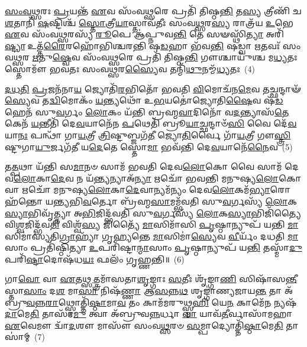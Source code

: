 {%
\-\ul{𑌸𑌂}\-\-\ul{𑌵}\-\-\ul{𑌥𑍍𑌸}\-𑌰𑌃 \ul{𑌪𑍍𑌰}\-𑌯𑌨𑍍𑌤᳴ \ul{𑌏}\-𑌵 𑌸𑌂᳴𑌵\-\ul{𑌥𑍍𑌸}\-𑌰𑍇 𑌪𑍍𑌰𑌤𑌿᳴ 𑌤𑌿𑌷𑍍𑌠\-\ul{𑌨𑍍𑌤𑌿} 𑌤\-\ul{𑌸𑍍𑌯} 𑌤𑍍𑌰𑍀𑌣𑌿᳴ 𑌚 \ul{𑌶}\-𑌤𑌾𑌨𑌿᳴ \ul{𑌷}\-𑌷𑍍𑌟𑌿𑌶𑍍𑌚᳴ \ul{𑌸𑍍𑌤𑍋}\-𑌤𑍍𑌰𑍀\-\ul{𑌯𑌾}\-𑌸𑍍𑌤𑌾𑌵᳴𑌤𑍀𑌃 𑌸𑌂𑌵\-\ul{𑌥𑍍𑌸}\-𑌰\-\ul{𑌸𑍍𑌯} 𑌰𑌾𑌤𑍍𑌰᳴𑌯 \ul{𑌉}\-𑌭𑍇 \ul{𑌏}\-𑌵 𑌸𑌂᳴𑌵\-\ul{𑌥𑍍𑌸}\-𑌰𑌸𑍍𑌯᳴ \ul{𑌰𑍂}\-𑌪𑍇 𑌆॑𑌪𑍍𑌨𑍁𑌵\-\ul{𑌨𑍍𑌤𑌿} 𑌤𑍇 𑌸𑍟𑌸𑍍𑌥𑌿᳴\-\ul{𑌤𑍍𑌯𑌾} 𑌅𑌰𑌿᳴\-\ul{𑌷𑍍𑌟𑍍𑌯𑌾} 𑌉𑌤𑍍𑌤᳴\-\ul{𑌰𑍈}\-𑌰𑌹𑍋᳴𑌭𑌿𑌶𑍍𑌚𑌰𑌨𑍍𑌤𑌿 𑌷\-\ul{𑌡}\-𑌹𑌾 𑌭᳴𑌵\-\ul{𑌨𑍍𑌤𑌿} 𑌷𑌡𑍍𑌵𑌾 \ul{𑌋}\-𑌤𑌵𑌃᳴ 𑌸𑌂𑌵\-\ul{𑌥𑍍𑌸}\-𑌰 \ul{𑌋}\-𑌤𑍁\-\ul{𑌷𑍍𑌵𑍇}\-𑌵 𑌸𑌂᳴𑌵\-\ul{𑌥𑍍𑌸}\-𑌰𑍇 𑌪𑍍𑌰𑌤𑌿᳴ 𑌤𑌿𑌷𑍍𑌠\-\ul{𑌨𑍍𑌤𑌿} 𑌗𑍗𑌶𑍍𑌚𑌾𑌯𑍁᳴𑌶𑍍𑌚 𑌮\-\ul{𑌧𑍍𑌯}\-𑌤𑌃 𑌸𑍍𑌤𑍋𑌮𑍗᳴ 𑌭𑌵𑌤𑌃 𑌸𑌂𑌵\-\ul{𑌥𑍍𑌸}\-𑌰\-\ul{𑌸𑍍𑌯𑍈}\-𑌵 𑌤𑌨𑍍𑌮𑌿᳴\-\ul{𑌥𑍁}\-𑌨𑌮𑍍𑌮᳴\-\ul{𑌧𑍍𑌯}\-𑌤𑌃~(4)

\-\ul{𑌦}\-\-\ul{𑌧}\-\-\ul{𑌤𑌿} \ul{𑌪𑍍𑌰}\-𑌜𑌨᳴𑌨𑌾\-\ul{𑌯} 𑌜𑍍𑌯𑍋𑌤𑌿᳴\-\ul{𑌰}\-𑌭𑌿𑌤𑍋᳴ 𑌭𑌵𑌤𑌿 \ul{𑌵𑌿}\-𑌮𑍋𑌚᳴𑌨\-\ul{𑌮𑍇}\-𑌵 𑌤𑌚𑍍𑌛𑌨𑍍𑌦𑌾𑍟᳴\-\ul{𑌸𑍍𑌯𑍇}\-𑌵 𑌤\-\ul{𑌦𑍍𑌵𑌿}\-𑌮𑍋𑌕𑌂᳴ \ul{𑌯}\-𑌨𑍍𑌤𑍍𑌯𑌥𑍋᳴ 𑌉\-\ul{𑌭}\-𑌯𑌤𑍋॑𑌜𑍍𑌯𑍋𑌤𑌿\-\ul{𑌷𑍈}\-𑌵 𑌷᳴\-\ul{𑌡}\-𑌹𑍇𑌨᳴ 𑌸𑍁\-\ul{𑌵}\-𑌰𑍍𑌗𑌂 \ul{𑌲𑍋}\-𑌕𑌂 𑌯᳴𑌨𑍍𑌤𑌿 𑌬𑍍𑌰𑌹𑍍𑌮\-\ul{𑌵𑌾}\-𑌦𑌿𑌨𑍋᳴ 𑌵\-\ul{𑌦}\-𑌨𑍍𑌤𑍍𑌯𑌾𑌸᳴\-\ul{𑌤𑍇} 𑌕𑍇𑌨᳴ \ul{𑌯}\-𑌨𑍍𑌤𑍀𑌤𑌿᳴ 𑌦𑍇\-\ul{𑌵}\-𑌯𑌾𑌨𑍇᳴𑌨 \ul{𑌪}\-𑌥𑍇𑌤𑌿᳴ 𑌬𑍍𑌰𑍂\-\ul{𑌯𑌾}\-𑌚𑍍𑌛𑌨𑍍𑌦𑌾𑍞᳴\-\ul{𑌸𑌿} 𑌵𑍈 𑌦𑍇᳴\-\ul{𑌵}\-𑌯𑌾\-\ul{𑌨𑌃} 𑌪𑌨𑍍𑌥𑌾᳴ 𑌗𑌾\-\ul{𑌯}\-𑌤𑍍𑌰𑍀 \ul{𑌤𑍍𑌰𑌿}\-𑌷𑍍𑌟𑍁𑌬𑍍𑌜𑌗᳴\-\ul{𑌤𑍀} 𑌜𑍍𑌯𑍋\-\ul{𑌤𑌿}\-𑌰𑍍𑌵𑍈 𑌗𑌾᳴\-\ul{𑌯}\-𑌤𑍍𑌰𑍀 𑌗𑍗\-\ul{𑌸𑍍𑌤𑍍𑌰𑌿}\-𑌷𑍍𑌟𑍁𑌗𑌾\-\ul{𑌯𑍁}\-𑌰𑍍𑌜𑌗᳴𑌤𑍀 𑌯\-\ul{𑌦𑍇}\-𑌤𑍇 𑌸𑍍𑌤𑍋\-\ul{𑌮𑌾} 𑌭𑌵᳴𑌨𑍍𑌤𑌿 𑌦𑍇\-\ul{𑌵}\-𑌯𑌾𑌨𑍇᳴\-\ul{𑌨𑍈}\-𑌵~(5)

𑌤\-\ul{𑌤𑍍𑌪}\-𑌥𑌾 𑌯᳴𑌨𑍍𑌤𑌿 𑌸\-\ul{𑌮𑌾}\-𑌨𑍞 𑌸𑌾𑌮᳴ 𑌭𑌵𑌤𑌿 𑌦𑍇𑌵\-\ul{𑌲𑍋}\-𑌕𑍋 𑌵𑍈 𑌸𑌾𑌮᳴ 𑌦𑍇𑌵\-\ul{𑌲𑍋}\-𑌕𑌾\-\ul{𑌦𑍇}\-𑌵 𑌨 𑌯᳴\-\ul{𑌨𑍍𑌤𑍍𑌯}\-𑌨𑍍𑌯𑌾𑌅᳴\-\ul{𑌨𑍍𑌯𑌾} 𑌋𑌚𑍋᳴ 𑌭𑌵𑌨𑍍𑌤𑌿 𑌮𑌨𑍁𑌷𑍍𑌯\-\ul{𑌲𑍋}\-𑌕𑍋 𑌵𑌾 𑌋𑌚𑍋᳴ 𑌮𑌨𑍁𑌷𑍍𑌯\-\ul{𑌲𑍋}\-𑌕𑌾\-\ul{𑌦𑍇}\-𑌵𑌾𑌨𑍍𑌯𑌮᳴𑌨𑍍𑌯𑌂 𑌦𑍇𑌵\-\ul{𑌲𑍋}\-𑌕𑌮᳴\-\ul{𑌭𑍍𑌯𑌾}\-𑌰𑍋𑌹᳴𑌨𑍍𑌤𑍋 𑌯𑌨𑍍𑌤𑍍𑌯𑌭𑌿\-\ul{𑌵}\-𑌰𑍍𑌤𑍋 𑌬𑍍𑌰᳴𑌹𑍍𑌮\-\ul{𑌸𑌾}\-𑌮𑌮𑍍𑌭᳴𑌵𑌤𑌿 𑌸𑍁\-\ul{𑌵}\-𑌰𑍍𑌗𑌸𑍍𑌯᳴ \ul{𑌲𑍋}\-𑌕\-\ul{𑌸𑍍𑌯𑌾}\-𑌭𑌿𑌵𑍃᳴𑌤𑍍𑌤𑍍𑌯𑌾 𑌅\-\ul{𑌭𑌿}\-𑌜𑌿𑌦𑍍𑌭᳴𑌵𑌤𑌿 𑌸𑍁\-\ul{𑌵}\-𑌰𑍍𑌗𑌸𑍍𑌯᳴ \ul{𑌲𑍋}\-𑌕\-\ul{𑌸𑍍𑌯𑌾}\-𑌭𑌿𑌜𑌿᳴𑌤𑍍𑌯𑍈 𑌵𑌿\-\ul{𑌶𑍍𑌵}\-𑌜𑌿𑌦𑍍𑌭᳴𑌵\-\ul{𑌤𑌿} 𑌵𑌿𑌶𑍍𑌵᳴\-\ul{𑌸𑍍𑌯} 𑌜𑌿𑌤𑍍𑌯𑍈᳴ \ul{𑌮𑌾}\-𑌸𑌿𑌮𑌾᳴𑌸𑌿 \ul{𑌪𑍃}\-𑌷𑍍𑌠𑌾𑌨𑍍𑌯𑍁𑌪᳴ 𑌯𑌨𑍍𑌤𑌿 \ul{𑌮𑌾}\-𑌸𑌿𑌮𑌾॑𑌸𑍍𑌯𑌤𑌿\-\ul{𑌗𑍍𑌰𑌾}\-𑌹𑍍𑌯𑌾᳴ 𑌗𑍃𑌹𑍍𑌯𑌨𑍍𑌤𑍇 \ul{𑌮𑌾}\-𑌸𑌿𑌮𑌾॑\-\ul{𑌸𑍍𑌯𑍇}\-𑌵 \ul{𑌵𑍀}\-𑌰𑍍𑌯𑌂᳴ 𑌦𑌧𑌤𑌿 \ul{𑌮𑌾}\-𑌸𑌾𑌂 𑌪𑍍𑌰𑌤𑌿᳴𑌷𑍍𑌠𑌿𑌤𑍍𑌯𑌾 \ul{𑌉}\-𑌪𑌰𑌿᳴𑌷𑍍𑌟𑌾\-\ul{𑌨𑍍𑌮𑌾}\-𑌸𑌾𑌂 \ul{𑌪𑍃}\-𑌷𑍍𑌠𑌾𑌨𑍍𑌯𑍁𑌪᳴ 𑌯\-\ul{𑌨𑍍𑌤𑌿} 𑌤𑌸𑍍𑌮𑌾᳴\-\ul{𑌦𑍁}\-𑌪𑌰𑌿᳴\-\ul{𑌷𑍍𑌟𑌾}\-𑌦𑍋𑌷᳴𑌧\-\ul{𑌯𑌃} 𑌫𑌲𑌂᳴ 𑌗𑍃𑌹𑍍𑌣𑌨𑍍𑌤𑌿॥~(6)

{\anuvakamend[{\-\ul{𑌗𑍋}\-\-\ul{𑌸}\-𑌤𑍍𑌤𑍍𑌰𑌂 𑌵𑌾 𑌏᳴𑌤𑌿 𑌸𑌂𑌵\-\ul{𑌥𑍍𑌸}\-𑌰𑍋॑\-𑌽𑌰𑍍𑌧\-\ul{𑌮𑌾}\-𑌸𑌾 𑌮𑌿᳴\-\ul{𑌥𑍁}\-𑌨𑌮𑍍𑌮᳴\-\ul{𑌧𑍍𑌯}\-𑌤𑍋 𑌦𑍇᳴\-\ul{𑌵}\-𑌯𑌾𑌨𑍇᳴\-\ul{𑌨𑍈}\-𑌵 \ul{𑌵𑍀}\-𑌰𑍍𑌯᳴𑌨𑍍𑌤𑍍𑌰𑌯𑍋᳴𑌦𑌶 𑌚}]}%

𑌗𑌾\-\ul{𑌵𑍋} 𑌵𑌾 \ul{𑌏}\-𑌤\-\ul{𑌥𑍍𑌸}\-𑌤𑍍𑌤𑍍𑌰𑌮𑌾᳴𑌸𑌤𑌾\-\ul{𑌶𑍃}\-𑌙𑍍𑌗𑌾𑌃 \ul{𑌸}\-𑌤𑍀𑌃 𑌶𑍃᳴𑌙𑍍𑌗𑌾\-\ul{𑌣𑌿} 𑌸𑌿𑌷𑌾᳴𑌸\-\ul{𑌨𑍍𑌤𑍀}\-𑌸𑍍𑌤𑌾\-\ul{𑌸𑌾𑌂} 𑌦\-\ul{𑌶} 𑌮𑌾\-\ul{𑌸𑌾} 𑌨𑌿𑌷᳴\-\ul{𑌣𑍍𑌣𑌾} 𑌆\-\ul{𑌸}\-𑌨𑍍𑌨\-\ul{𑌥} 𑌶𑍃𑌙𑍍𑌗𑌾॑𑌣𑍍𑌯𑌜𑌾𑌯\-\ul{𑌨𑍍𑌤} 𑌤𑌾 𑌅᳴𑌬𑍍𑌰𑍁\-\ul{𑌵}\-𑌨𑍍𑌨\-\ul{𑌰𑌾}\-𑌥𑍍𑌸𑍍𑌮𑍋𑌤𑍍𑌤𑌿᳴\-\ul{𑌷𑍍𑌠𑌾}\-𑌮𑌾\-\ul{𑌵} 𑌤𑌂 𑌕𑌾𑌮᳴𑌮𑌰𑍁𑌥𑍍𑌸𑍍𑌮\-\ul{𑌹𑌿} 𑌯𑍇\-\ul{𑌨} 𑌕𑌾𑌮𑍇᳴\-\ul{𑌨} 𑌨𑍍𑌯𑌷᳴\-\ul{𑌦𑌾}\-𑌮𑍇\-\ul{𑌤𑌿} 𑌤𑌾𑌸𑌾᳴\-\ul{𑌮𑍁} 𑌤𑍍𑌵𑌾 𑌅᳴𑌬𑍍𑌰𑍁𑌵\-\ul{𑌨𑍍𑌨}\-𑌰𑍍𑌧𑌾 \ul{𑌵𑌾} 𑌯𑌾𑌵᳴\-\ul{𑌤𑍀}\-𑌰𑍍𑌵𑌾𑌸𑌾᳴𑌮𑌹𑌾 \ul{𑌏}\-𑌵𑍇𑌮𑍗 𑌦𑍍𑌵𑌾᳴\-\ul{𑌦}\-𑌶𑍗 𑌮𑌾𑌸𑍗᳴ 𑌸𑌂𑌵\-\ul{𑌥𑍍𑌸}\-𑌰𑍞 \ul{𑌸}\-𑌮𑍍𑌪𑌾𑌦𑍍𑌯𑍋𑌤𑍍𑌤𑌿᳴\-\ul{𑌷𑍍𑌠𑌾}\-𑌮𑍇\-\ul{𑌤𑌿} 𑌤𑌾𑌸𑌾॑𑌮𑍍~(7)

}
